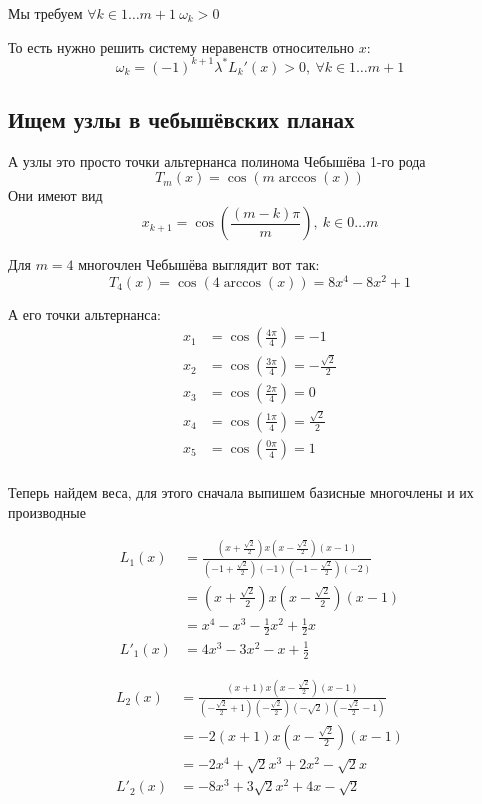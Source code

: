 \documentclass[12pt,a4paper]{article}
\begin{document}
	Мы требуем $\forall k \in 1 \ldots m+1 \ \omega_k > 0 $
	
	\noindent То есть нужно решить систему неравенств относительно $x$:
	\[
	\omega_k  = (-1)^{k+1} \lambda^* L_k'(x)  > 0 , \ \forall k \in 1 \ldots m+1 
	\]
	
	
	
	\subsection{Ищем узлы в чебышёвских планах}
	
	\noindent А узлы это просто точки альтернанса полинома Чебышёва 1-го рода 
	\[
	T_{m}(x) = \cos( m \arccos(x))
	\]
	\noindent Они имеют вид 
	\[
	x_{k+1} = \cos \left( \frac{(m-k) \pi}{m} \right), \ k \in 0 \ldots m
	\]
	
	\noindent Для $m=4$ многочлен Чебышёва выглядит вот так:
	\[
	T_{4}(x) = \cos( 4 \arccos(x)) = 8x^4 - 8x^2 + 1
	\]
	
	\noindent А его точки альтернанса:
	\begin{align*}
		x_1 &= \cos \left( \frac{4\pi}{4} \right) = -1\\
		x_2 &= \cos \left( \frac{3\pi}{4} \right) = -\frac{\sqrt{2}}{2}\\
		x_3 &= \cos \left( \frac{2\pi}{4} \right) = 0\\
		x_4 &= \cos \left( \frac{1\pi}{4} \right) = \frac{\sqrt{2}}{2}\\
		x_5 &= \cos \left( \frac{0\pi}{4} \right) = 1\\
	\end{align*}
		
		
	\noindent Теперь найдем веса, для этого сначала выпишем базисные многочлены и их производные
	
	\begin{align*}
		L_1(x)
		&=
		\frac{
			\left(x+\frac{\sqrt{2}}{2}\right)
			x
			\left(x-\frac{\sqrt{2}}{2}\right)
			(x-1)
		}{
			\left(-1+\frac{\sqrt{2}}{2}\right)
			(-1)
			\left(-1-\frac{\sqrt{2}}{2}\right)
			(-2)
		}
		\\
		&=
		\left(x+\frac{\sqrt{2}}{2}\right)
		x
		\left(x-\frac{\sqrt{2}}{2}\right)
		(x-1)
		\\
		&=
		x^4-x^3-\frac{1}{2}x^2+\frac{1}{2}x
		\\[4mm]
		L'_1(x) &= 4x^3 -3x^2-x+\frac{1}{2}
	\end{align*}
	
	
	\begin{align*}
		L_2(x)
		&=
		\frac{
			(x+1)
			x
			\left(x-\frac{\sqrt{2}}{2}\right)
			(x-1)
		}{
			\left(-\frac{\sqrt{2}}{2}+1\right)
			\left(-\frac{\sqrt{2}}{2}\right)
			(-\sqrt{2})
			\left(-\frac{\sqrt{2}}{2}-1\right)
		}
		\\
		&=
		-2(x+1)
		x
		\left(x-\frac{\sqrt{2}}{2}\right)
		(x-1)
		\\
		&=
		-2x^4+\sqrt{2}x^3+2x^2-\sqrt{2}x \\[4mm]
		L'_2(x) &= -8x^3 + 3\sqrt{2}x^2 + 4x - \sqrt{2} 	
	\end{align*}
		
\end{document}
